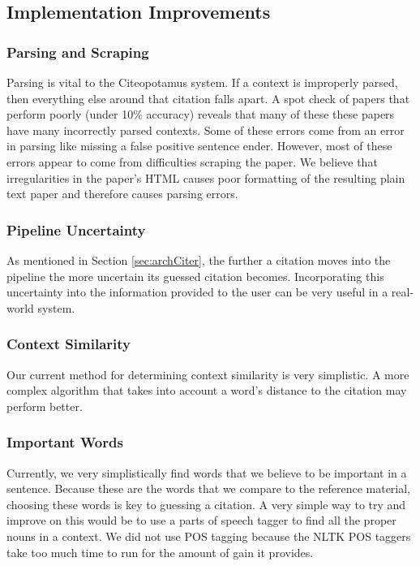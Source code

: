 \documentclass[10pt, conference, compsocconf]{IEEEtran}
\begin{document}
\subsection{Implementation Improvements}

\subsubsection{Parsing and Scraping}
Parsing is vital to the Citeopotamus system. If a context is improperly parsed, then everything else around that citation falls apart.
A spot check of papers that perform poorly (under 10\% accuracy) reveals that many of these these papers have many incorrectly parsed contexts.
Some of these errors come from an error in parsing like missing a false positive sentence ender. However, most of these errors appear to
come from difficulties scraping the paper. We believe that irregularities in the paper's HTML causes poor formatting of the resulting
plain text paper and therefore causes parsing errors.

\subsubsection{Pipeline Uncertainty}
As mentioned in Section \ref{sec:archCiter}, the further a citation moves into the pipeline the more uncertain its guessed citation becomes.
Incorporating this uncertainty into the information provided to the user can be very useful in a real-world system.

\subsubsection{Context Similarity}
Our current method for determining context similarity is very simplistic. A more complex algorithm that takes into account a word's distance to the
citation may perform better.

\subsubsection{Important Words}
Currently, we very simplistically find words that we believe to be important in a sentence. Because these are the words that
we compare to the reference material, choosing these words is key to guessing a citation. A very simple way to try and improve on this
would be to use a parts of speech tagger to find all the proper nouns in a context. We did not use POS tagging because
the NLTK POS taggers take too much time to run for the amount of gain it provides.
\end{document}
